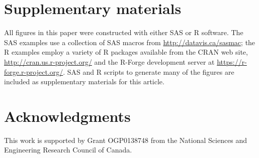 \documentclass[11pt]{article}%
\begin{document}
 











\section{Supplementary materials}
All figures in this paper were constructed with either SAS or R software.  
The SAS examples use a collection of SAS macros from \url{http://datavis.ca/sasmac}; the
R examples employ a variety of R packages available from the CRAN web site, \url{http://cran.us.r-project.org/}
and the R-Forge development server at \url{https://r-forge.r-project.org/}.
SAS and R scripts to generate many of the figures are included as supplementary materials for this article.


\section{Acknowledgments}
This work is supported by Grant OGP0138748 from the National Sciences and Engineering Research Council of Canada.


%
\end{document}
